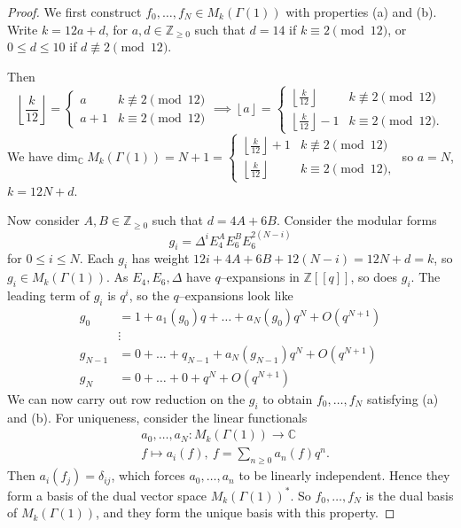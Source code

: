 \documentclass{article}
\theoremstyle{definition}
\begin{document}
\begin{proof}
    We first construct $f_0,\ldots,f_N \in M_k(\Gamma(1))$ with properties (a) and (b). Write $k = 12a + d$, for $a, d \in \mathbb{Z}_{\ge 0}$ such that $d = 14$ if $k \equiv 2 \pmod{12}$, or $0\le d\le 10$ if $d \not\equiv 2 \pmod{12}$.
    \vspace{1mm}
     
    Then $$\left\lfloor \frac{k}{12} \right\rfloor = \begin{cases}
        a & k\not\equiv 2 \pmod{12}\\
        a+1 & k \equiv 2 \pmod{12}
    \end{cases} \implies \left\lfloor a\right\rfloor = \begin{cases}
        \left\lfloor \frac{k}{12} \right\rfloor & k\not\equiv 2 \pmod{12}\\
        \left\lfloor \frac{k}{12} \right\rfloor-1 & k \equiv 2 \pmod{12}.
    \end{cases}$$
    We have $\text{dim}_{\mathbb{C}}~M_k(\Gamma(1)) = N+1 = \begin{cases}
        \left\lfloor \frac{k}{12} \right\rfloor+1 & k \not\equiv 2 \pmod{12}\\
        \left\lfloor \frac{k}{12} \right\rfloor & k \equiv 2 \pmod{12},
    \end{cases}$ 
    so $a = N$, $k = 12N + d$.
    \vspace{1mm}
     
    Now consider $A, B \in \mathbb{Z}_{\ge 0}$ such that $d = 4A + 6B$. Consider the modular forms $$g_i = \Delta^i E_4^A E_6^B E_6^{2(N-i)}$$ for $0\le i\le N$. Each $g_i$ has weight $12i + 4A + 6B + 12(N-i) = 12N + d = k$, so $g_i \in M_k(\Gamma(1))$. As $E_4, E_6, \Delta$ have $q$--expansions in $\mathbb{Z}[[q]]$, so does $g_i$. The leading term of $g_i$ is $q^i$, so the $q$--expansions look like 
    \begin{align*}
        g_0 &= 1 + a_1(g_0)q + \ldots + a_N(g_0)q^N + O(q^{N+1})\\
        &\vdots\\
        g_{N-1} &= 0 + \ldots + q_{N-1} + a_N(g_{N-1})q^N + O(q^{N+1})\\
        g_N &= 0 + \ldots + 0 + q^N + O(q^{N+1})
    \end{align*}
    We can now carry out row reduction on the $g_i$ to obtain $f_0,\ldots,f_N$ satisfying (a) and (b). For uniqueness, consider the linear functionals 
    \begin{align*}
        &a_0,\ldots,a_N : M_k(\Gamma(1)) \to \mathbb{C}\\
        &f \mapsto a_i(f), ~f = \sum_{n\ge 0}^{} a_n(f)q^n.
    \end{align*}
    Then $a_i(f_j) = \delta_{ij}$, which forces $a_0,\ldots,a_n$ to be linearly independent. Hence they form a basis of the dual vector space $M_k(\Gamma(1))^{*}$. So $f_0,\ldots,f_N$ is the dual basis of $M_k(\Gamma(1))$, and they form the unique basis with this property.
\end{proof}
\end{document}
